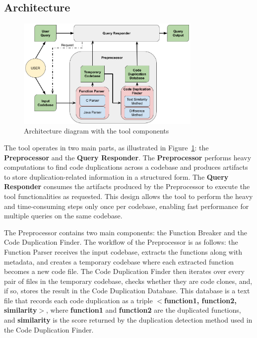 \documentclass[conference]{IEEEtran}
\begin{document}
\subsection{Architecture}

\begin{figure}[ht]
\centering
\includegraphics[width=3.5in]{fig/diagrama_mestrado.png}
\caption{Architecture diagram with the tool components}
\label{fig:diagram}
\end{figure}

The tool operates in two main parts, as illustrated in Figure~\ref{fig:diagram}: the \textbf{Preprocessor} and the \textbf{Query Responder}. 
The \textbf{Preprocessor} performs heavy computations to find code 
duplications across a codebase and produces artifacts to store duplication-related information 
in a structured form. The \textbf{Query Responder} consumes the artifacts produced 
by the Preprocessor to execute the tool functionalities as requested. This design allows the 
tool to perform the heavy and time-consuming steps only once per codebase, enabling fast performance 
for multiple queries on the same codebase.

The Preprocessor contains two main components: the Function Breaker and the Code Duplication Finder. 
The workflow of the Preprocessor is as follows: the Function Parser receives the input codebase,
extracts the functions along with metadata, and creates a temporary codebase where each extracted 
function becomes a new code file. The Code Duplication Finder then iterates over every pair of files 
in the temporary codebase, checks whether they are code clones, and, if so, stores the result in 
the Code Duplication Database. This database is a text file that records each code duplication as a triple 
\textbf{$<$function1, function2, similarity$>$}, where \textbf{function1} and \textbf{function2} are the 
duplicated functions, and \textbf{similarity} is the score returned by the duplication detection method 
used in the Code Duplication Finder.
\end{document}
